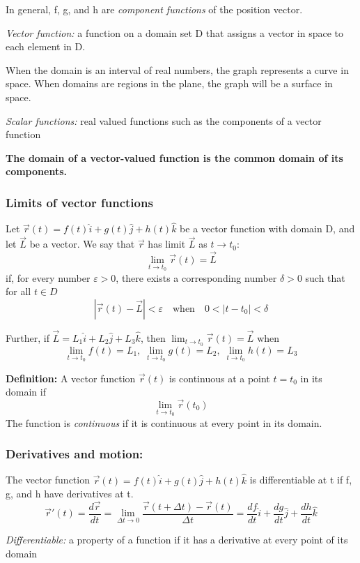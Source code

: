 \documentclass[12pt]{article}
\begin{document}
In general, f, g, and h are \emph{component functions} of the position vector.

\emph{Vector function:} a function on a domain set D that assigns a vector in space to each element in D. 

When the domain is an interval of real numbers, the graph represents a curve in space. When domains are regions in the plane, the graph will be a surface in space. 

\emph{Scalar functions:} real valued functions such as the components of a vector function

\textbf{The domain of a vector-valued function is the common domain of its components.}

\subsubsection{Limits of vector functions}
Let $\vec{r}(t) = f(t)\hat{i} + g(t) \hat{j} + h(t) \hat{k}$ be a vector function with domain D, and let $\vec{L}$ be a vector. We say that $\vec{r}$ has limit $\vec{L}$ as $t \rightarrow t_0$:
$$\lim_{t \to t_0} \vec{r}(t )= \vec{L}$$
if, for every number $\varepsilon > 0$, there exists a corresponding number $\delta > 0$ such that for all $t \in D$
$$|\vec{r}(t) - \vec{L}| < \varepsilon \quad \text{when} \quad 0 < |t - t_0| < \delta$$

Further, if $\vec{L} = L_1 \hat{i} + L_2 \hat{j} + L_3 \hat{k}$, then $\lim_{t\to t_0} \vec{r}(t) = \vec{L}$ when 
$$\lim_{t \to t_0} f(t) = L_1, \; \lim_{t \to t_0} g(t) = L_2, \; \lim_{t \to t_0} h(t) = L_3$$

\textbf{Definition:}
A vector function $\vec{r}(t)$ is continuous at a point $t = t_0$ in its domain if 
$$\lim _{t\to t_0} \vec{r}(t_0)$$
The function is \emph{continuous} if it is continuous at every point in its domain. 

\subsubsection{Derivatives and motion:}
The vector function $\vec{r}(t) = f(t)\hat{i} + g(t) \hat{j} + h(t) \hat{k}$ is differentiable at t if f, g, and h have derivatives at t.
$$\vec{r}'(t) = \frac{d\vec{r}}{dt} = \lim_{\Delta t \to 0} \frac{\vec{r}(t + \Delta t) - \vec{r}(t)}{\Delta t} = \frac{df}{dt} \hat{i} + \frac{dg}{dt} \hat{j} + \frac{dh}{dt} \hat{k}$$

\emph{Differentiable:} a property of a function if it has a derivative at every point of its domain
\end{document}
